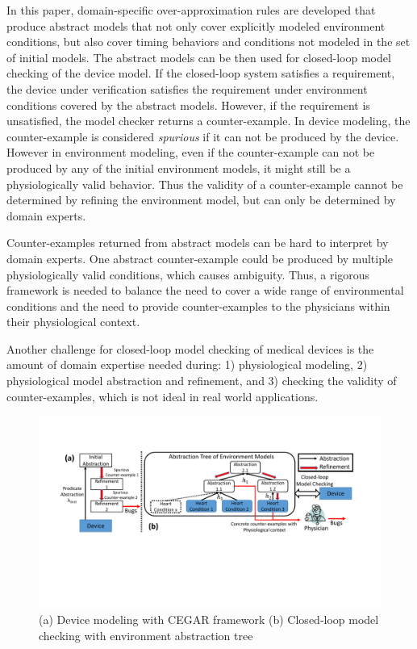 In this paper, domain-specific over-approximation rules are developed that produce abstract models that not only cover explicitly modeled environment conditions, but also cover timing behaviors and conditions not modeled in the set of initial models. 
The abstract models can be then used for closed-loop model checking of the device model. 
If the closed-loop system satisfies a requirement, the device under verification satisfies the requirement under environment conditions covered by the abstract models. 
However, if the requirement is unsatisfied, the model checker returns a counter-example. 
In device modeling, the counter-example is considered \emph{spurious} if it can not be produced by the device.
However in environment modeling, even if the counter-example can not be produced by any of the initial environment models, it might still be a physiologically valid behavior.
Thus the validity of a counter-example cannot be determined by refining the environment model, but can only be determined by domain experts. 

Counter-examples returned from abstract models can be hard to interpret by domain experts.
One abstract counter-example could be produced by multiple physiologically valid conditions, which causes ambiguity.
Thus, a rigorous framework is needed to balance the need to cover a wide range of environmental conditions and the need to provide counter-examples to the physicians within their physiological context.

Another challenge for closed-loop model checking of medical devices is the amount of domain expertise needed during: 1) physiological modeling, 2) physiological model abstraction and refinement, and 3) checking the validity of counter-examples, which is not ideal in real world applications. 

\begin{figure}[!t]
		\centering
		\includegraphics[width=1.05\textwidth]{figs/distinction.pdf}
		\caption{\small (a) Device modeling with CEGAR framework (b) Closed-loop model checking with environment abstraction tree}
		\label{fig:distinction}
\end{figure}


